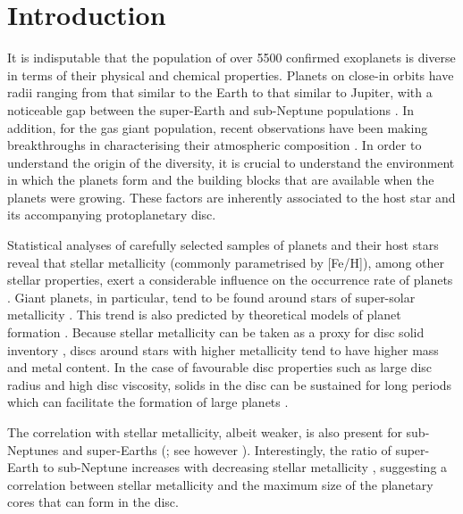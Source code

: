 \documentclass{aa}
\begin{document}

    
   \maketitle

\section{Introduction}
It is indisputable that the population of over 5500 confirmed exoplanets is diverse in terms of their physical and chemical properties. Planets on close-in orbits have radii ranging from that similar to the Earth to that similar to Jupiter, with a noticeable gap between the super-Earth and sub-Neptune populations \citep[e.g.][]{Fulton2017}. In addition, for the gas giant population, recent observations have been making breakthroughs in characterising their atmospheric composition \citep[e.g.][]{Line2021,August2023,Bean2023,Pelletier2023}. In order to understand the origin of the diversity, it is crucial to understand the environment in which the planets form and the building blocks that are available when the planets were growing. These factors are inherently associated to the host star and its accompanying protoplanetary disc.

Statistical analyses of carefully selected samples of planets and their host stars reveal that stellar metallicity (commonly parametrised by [Fe/H]), among other stellar properties, exert a considerable influence on the occurrence rate of planets \citep[e.g.][]{UdrySantos2007,Petigura2018,Chen2022}. Giant planets, in particular, tend to be found around stars of super-solar metallicity \citep[e.g.][]{Santos2004,FischerValenti2005,Johnson2010,Mortier2013,Petigura2018}. This trend is also predicted by theoretical models of planet formation \citep[e.g.][]{IdaLin2004,Mordasini2012,Bitsch2015b,Ndugu2018}. Because stellar metallicity can be taken as a proxy for disc solid inventory \citep{HuehnBitsch2023}, discs around stars with higher metallicity tend to have higher mass \citep{Andrews2013} and metal content. In the case of favourable disc properties such as large disc radius and high disc viscosity, solids in the disc can be sustained for long periods \citep{BitschMah2023} which can facilitate the formation of large planets \citep{LambrechtsJohansen2014,SavvidouBitsch2023}. 

The correlation with stellar metallicity, albeit weaker, is also present for sub-Neptunes and super-Earths (\citealp{WangFischer2015,Petigura2018}; see however \citealp{Sousa2008,Buchhave2012}). Interestingly, the ratio of super-Earth to sub-Neptune increases with decreasing stellar metallicity \citep{Chen2022}, suggesting a correlation between stellar metallicity and the maximum size of the planetary cores that can form in the disc. 
\end{document}
